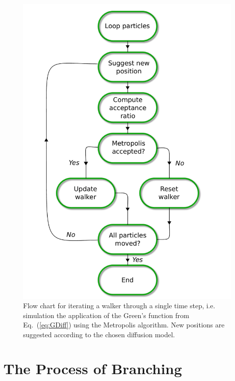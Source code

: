 \begin{figure}
 \begin{center}
  \includegraphics[scale=0.65]{../Graphics/DiffusionUML.pdf}
  \caption{Flow chart for iterating a walker through a single time step, i.e. simulation the application of the Green's function from Eq.~(\ref{eq:GDiff}) using the Metropolis algorithm. New positions are suggested according to the chosen diffusion model.}
  \label{fig:diffFlowChart}
 \end{center}
\end{figure}
\clearpage




\section{The Process of Branching}
\label{sec:branching}

